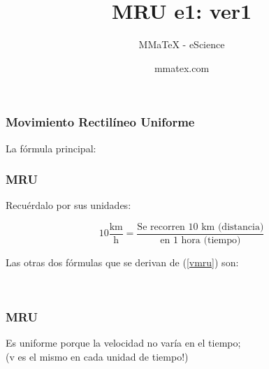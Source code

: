 \documentclass{beamer}
\title{MRU e1: ver1}
\subtitle{MMaTeX - eScience}
\author{mmatex.com}
\begin{document}
\maketitle


\begin{frame}
\frametitle{Movimiento Rectil\'ineo Uniforme}
La f\'ormula principal:

{\huge \vmru}

\vNUa
\end{frame}

\begin{frame}
\frametitle{MRU}
Recu\'erdalo por sus unidades:

\begin{equation*}
10\frac{\text{km}}{\text{h}} =
\frac{\text{Se recorren 10 km ({distancia})}}
{\text{en 1 hora ({tiempo})}}
\end{equation*}

Las otras dos f\'ormulas que se derivan de (\ref{vmru}) son:

{\large \xmru \\ \tmru}
\end{frame}

\begin{frame}
\frametitle{MRU}
Es uniforme porque la velocidad no var\'ia en el tiempo; \\
(v es el mismo en cada unidad de tiempo!)

\begin{center}
\end{center}
\end{frame}
\end{document}
